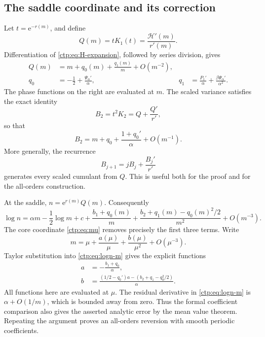 \documentclass[11pt,a4paper]{article}
\numberwithin{equation}{section}
\theoremstyle{definition}
\theoremstyle{remark}
\newcommand{\e}{\mathrm e}
\newcommand{\HH}{\mathcal H}
\begin{document}
\subsection{The saddle coordinate and its correction}
Let $t=\e^{-r(m)}$, and define
\begin{equation}\label{ctp:eq:Q}
 Q(m)=tK_1(t)=\frac{\HH'(m)}{r'(m)}.
\end{equation}
Differentiation of \eqref{ctp:eq:H-expansion}, followed by series division,
gives
\begin{align}
 Q(m)&=m+q_0(m)+\frac{q_1(m)}m+O(m^{-2}),\label{ctp:eq:Qexp}\\
 q_0&=-\frac12+\frac{\Psi_\alpha'}\alpha,
 &q_1&=\frac{P_1'}\alpha+\frac{\beta\Psi_\alpha'}{\alpha^2}.
 \label{ctp:eq:q01}
\end{align}
The phase functions on the right are evaluated at $m$.
The scaled variance satisfies the exact identity
\begin{equation}\label{ctp:eq:B2Q}
 B_2=t^2K_2=Q+\frac{Q'}{r'},
\end{equation}
so that
\begin{equation}\label{ctp:eq:B2exp}
 B_2=m+q_0+\frac{1+q_0'}\alpha+O(m^{-1}).
\end{equation}
More generally, the recurrence
\begin{equation}\label{ctp:eq:B-recursion}
 B_{j+1}=jB_j+\frac{B_j'}{r'}
\end{equation}
generates every scaled cumulant from $Q$. This is useful both for the
proof and for the all-orders construction.

At the saddle, $n=\e^{r(m)}Q(m)$. Consequently
\begin{equation}\label{ctp:eq:logn-m}
 \log n=\alpha m-\frac12\log m+c+
 \frac{b_1+q_0(m)}m+
 \frac{b_2+q_1(m)-q_0(m)^2/2}{m^2}+O(m^{-3}).
\end{equation}
The core coordinate \eqref{ctp:eq:mu} removes precisely the first three
terms. Write
\begin{equation}\label{ctp:eq:m-reversion}
 m=\mu+\frac{a(\mu)}\mu+\frac{b(\mu)}{\mu^2}+O(\mu^{-3}).
\end{equation}
Taylor substitution into \eqref{ctp:eq:logn-m} gives the explicit functions
\begin{align}
 a&=-\frac{b_1+q_0}{\alpha},\label{ctp:eq:a}\\
 b&=\frac{(1/2-q_0')a-(b_2+q_1-q_0^2/2)}\alpha.
 \label{ctp:eq:b}
\end{align}
All functions here are evaluated at $\mu$.
The residual derivative in \eqref{ctp:eq:logn-m} is $\alpha+O(1/m)$,
which is bounded away from zero. Thus the formal coefficient comparison
also gives the asserted analytic error by the mean value theorem.
Repeating the argument proves an all-orders reversion with smooth periodic
coefficients.
\end{document}

